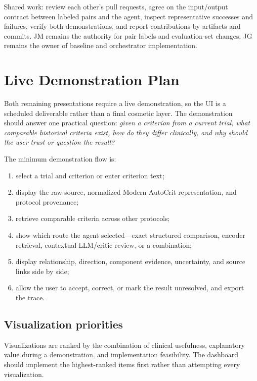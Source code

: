 \documentclass[10pt]{article}
\begin{document}
Shared work: review each other's pull requests, agree on the input/output contract between labeled pairs and the agent, inspect representative successes and failures, verify both demonstrations, and report contributions by artifacts and commits. JM remains the authority for pair labels and evaluation-set changes; JG remains the owner of baseline and orchestrator implementation.

\section{Live Demonstration Plan}
Both remaining presentations require a live demonstration, so the UI is a scheduled deliverable rather than a final cosmetic layer. The demonstration should answer one practical question: \emph{given a criterion from a current trial, what comparable historical criteria exist, how do they differ clinically, and why should the user trust or question the result?}

The minimum demonstration flow is:
\begin{enumerate}
\item select a trial and criterion or enter criterion text;
\item display the raw source, normalized Modern AutoCrit representation, and protocol provenance;
\item retrieve comparable criteria across other protocols;
\item show which route the agent selected---exact structured comparison, encoder retrieval, contextual LLM/critic review, or a combination;
\item display relationship, direction, component evidence, uncertainty, and source links side by side;
\item allow the user to accept, correct, or mark the result unresolved, and export the trace.
\end{enumerate}

\subsection{Visualization priorities}
Visualizations are ranked by the combination of clinical usefulness, explanatory value during a demonstration, and implementation feasibility. The dashboard should implement the highest-ranked items first rather than attempting every visualization.
\end{document}
